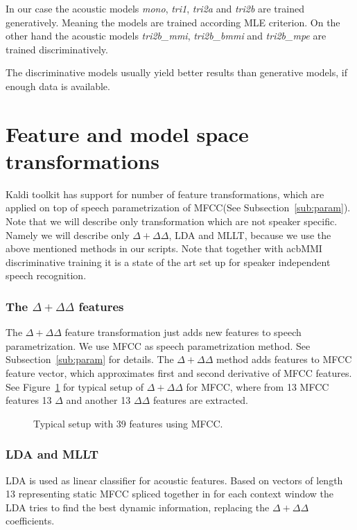 In our case the acoustic models {\it mono}, {\it tri1}, {\it tri2a}\/
and {\it tri2b}\/ are trained generatively.
Meaning the models are trained according \ac{MLE} criterion.
On the other hand the acoustic models {\it tri2b\_mmi}, {\it tri2b\_bmmi}\/
and {\it tri2b\_mpe}\/ are trained discriminatively.

The discriminative models usually yield better results than generative models, 
if enough data is available. 



\section{Feature and model space transformations}
\label{sec:transform}

Kaldi toolkit has support for number of feature transformations, which are applied on top
of speech parametrization of \ac{MFCC}(See Subsection~\ref{sub:param}).
Note that we will describe only transformation which are not speaker specific.
Namely we will describe only $\Delta + \Delta\Delta$, \ac{LDA} and \ac{MLLT},
because we use the above mentioned methods in our scripts.
Note that together with ac{bMMI} discriminative training it is
a state of the art set up for speaker independent speech recognition\cite{morbini2013asr}.

\subsubsection*{The $\Delta+\Delta\Delta$ features}
The $\Delta + \Delta\Delta$ feature transformation 
just adds new features to speech parametrization.
We use \ac{MFCC} as speech parametrization method. See Subsection~\ref{sub:param} for details.
The $\Delta + \Delta\Delta$ method adds features to \ac{MFCC} feature vector, which approximates 
first and second derivative of \ac{MFCC} features.
See Figure~\ref{fig:delta} for typical setup of $\Delta + \Delta\Delta$ for \ac{MFCC},
where from 13 \ac{MFCC} features 13 $\Delta$ and another 13 $\Delta\Delta$ features are extracted.

\begin{figure}
    \begin{center}
    
    \caption{Typical setup with 39 features using \ac{MFCC}.}
    \label{fig:delta} 
    \end{center}
\end{figure}


\subsubsection*{\acl{LDA} and \ac{MLLT}}
\ac{LDA} is used as linear classifier for acoustic features.
Based on vectors of length 13 representing static \ac{MFCC} 
spliced together in for each context window the \ac{LDA} tries to 
find the best dynamic information, replacing the $\Delta+\Delta\Delta$ coefficients.

